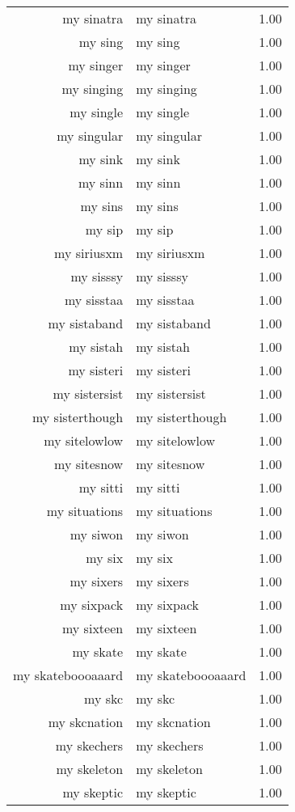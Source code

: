 \begin{table}[ht]
\begin{tabular}{rlr}
  my sinatra & my sinatra & 1.00 \\ 
  my sing & my sing & 1.00 \\ 
  my singer & my singer & 1.00 \\ 
  my singing & my singing & 1.00 \\ 
  my single & my single & 1.00 \\ 
  my singular & my singular & 1.00 \\ 
  my sink & my sink & 1.00 \\ 
  my sinn & my sinn & 1.00 \\ 
  my sins & my sins & 1.00 \\ 
  my sip & my sip & 1.00 \\ 
  my siriusxm & my siriusxm & 1.00 \\ 
  my sisssy & my sisssy & 1.00 \\ 
  my sisstaa & my sisstaa & 1.00 \\ 
  my sistaband & my sistaband & 1.00 \\ 
  my sistah & my sistah & 1.00 \\ 
  my sisteri & my sisteri & 1.00 \\ 
  my sistersist & my sistersist & 1.00 \\ 
  my sisterthough & my sisterthough & 1.00 \\ 
  my sitelowlow & my sitelowlow & 1.00 \\ 
  my sitesnow & my sitesnow & 1.00 \\ 
  my sitti & my sitti & 1.00 \\ 
  my situations & my situations & 1.00 \\ 
  my siwon & my siwon & 1.00 \\ 
  my six & my six & 1.00 \\ 
  my sixers & my sixers & 1.00 \\ 
  my sixpack & my sixpack & 1.00 \\ 
  my sixteen & my sixteen & 1.00 \\ 
  my skate & my skate & 1.00 \\ 
  my skateboooaaard & my skateboooaaard & 1.00 \\ 
  my skc & my skc & 1.00 \\ 
  my skcnation & my skcnation & 1.00 \\ 
  my skechers & my skechers & 1.00 \\ 
  my skeleton & my skeleton & 1.00 \\ 
  my skeptic & my skeptic & 1.00 \\ 

\end{tabular}
\end{table}
